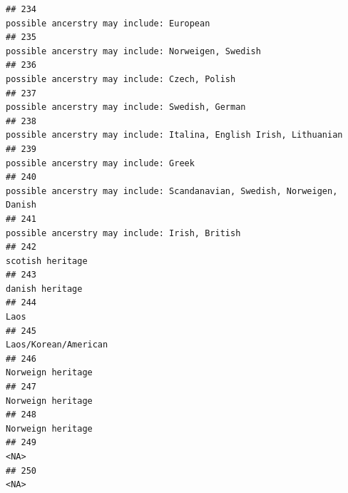 \documentclass[]{article}
\begin{document}
\begin{verbatim}
## 234                                                                                                            possible ancerstry may include: European
## 235                                                                                                  possible ancerstry may include: Norweigen, Swedish
## 236                                                                                                       possible ancerstry may include: Czech, Polish
## 237                                                                                                     possible ancerstry may include: Swedish, German
## 238                                                                                  possible ancerstry may include: Italina, English Irish, Lithuanian
## 239                                                                                                               possible ancerstry may include: Greek
## 240                                                                            possible ancerstry may include: Scandanavian, Swedish, Norweigen, Danish
## 241                                                                                                      possible ancerstry may include: Irish, British
## 242                                                                                                                                    scotish heritage
## 243                                                                                                                                     danish heritage
## 244                                                                                                                                                Laos
## 245                                                                                                                                Laos/Korean/American
## 246                                                                                                                                   Norweign heritage
## 247                                                                                                                                   Norweign heritage
## 248                                                                                                                                   Norweign heritage
## 249                                                                                                                                                <NA>
## 250                                                                                                                                                <NA>

\end{verbatim}
\end{document}

